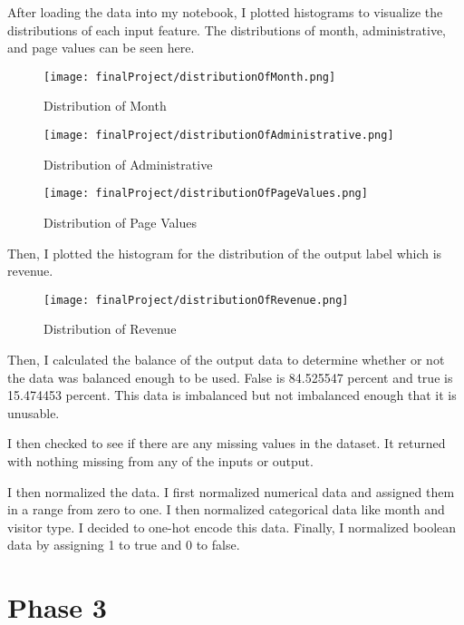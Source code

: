 \documentclass{article}
\begin{document}
After loading the data into my notebook, I plotted histograms to visualize the distributions of each input feature. The distributions of month, administrative, and page values can be seen here.

\begin{figure}[H]
\centering
\texttt{[image: finalProject/distributionOfMonth.png]}
\caption{Distribution of Month}
\label{fig:my_label}
\end{figure}

\begin{figure}[H]
\centering
\texttt{[image: finalProject/distributionOfAdministrative.png]}
\caption{Distribution of Administrative}
\label{fig:my_label}
\end{figure}

\begin{figure}[H]
\centering
\texttt{[image: finalProject/distributionOfPageValues.png]}
\caption{Distribution of Page Values}
\label{fig:my_label}
\end{figure}

Then, I plotted the histogram for the distribution of the output label which is revenue. 

\begin{figure}[H]
\centering
\texttt{[image: finalProject/distributionOfRevenue.png]}
\caption{Distribution of Revenue}
\label{fig:my_label}
\end{figure}

Then, I calculated the balance of the output data to determine whether or not the data was balanced enough to be used. False is 84.525547 percent and true is 15.474453 percent. This data is imbalanced but not imbalanced enough that it is unusable. 

I then checked to see if there are any missing values in the dataset. It returned with nothing missing from any of the inputs or output.

I then normalized the data. I first normalized numerical data and assigned them in a range from zero to one. I then normalized categorical data like month and visitor type. I decided to one-hot encode this data. Finally, I normalized boolean data by assigning 1 to true and 0 to false. 

\section{Phase 3}
\end{document}
